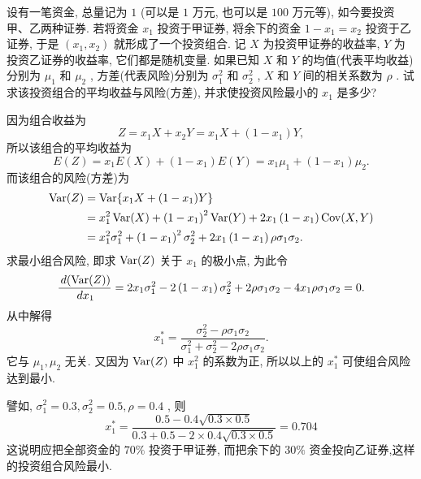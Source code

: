 	\begin{example}[(投资风险组合)]\label{exam:3.4.11}
		设有一笔资金, 总量记为 $1$ (可以是 $1$ 万元, 也可以是 $100$ 万元等), 如今要投资甲、乙两种证券. 若将资金 $x_1$ 投资于甲证券, 将余下的资金 $1-x_1=x_2$ 投资于乙证券, 于是 $(x_1,x_2)$ 就形成了一个投资组合. 记 $X$ 为投资甲证券的收益率, $Y$ 为投资乙证券的收益率, 它们都是随机变量. 如果已知 $X$ 和 $Y$ 的均值(代表平均收益)分别为 $\mu_1$ 和 $\mu_2$ , 方差(代表风险)分别为 $\sigma_1^2$ 和 $\sigma_2^2$ , $X$ 和 $Y$ 间的相关系数为 $\rho$ . 试求该投资组合的平均收益与风险(方差), 并求使投资风险最小的 $x_1$ 是多少?
		\begin{solution}
			因为组合收益为
			\begin{equation*}
				Z=x_{1} X+x_{2} Y=x_{1} X+\left(1-x_{1}\right) Y,
			\end{equation*}
			所以该组合的平均收益为
			\begin{equation*}
				E(Z)=x_{1} E(X)+\left(1-x_{1}\right) E(Y)=x_{1} \mu_{1}+\left(1-x_{1}\right) \mu_{2}.
			\end{equation*}
			而该组合的风险(方差)为
			\begin{align*}
				\operatorname{Var}(Z)&=\operatorname{Var}\{ x_1 X+(1-x_1)Y \}\\
				&=x_{1}^{2} \operatorname{Var}(X)+\left(1-x_{1}\right)^{2} \operatorname{Var}(Y)+2 x_{1}\left(1-x_{1}\right) \operatorname{Cov}(X, Y)\\
				&=x_{1}^{2} \sigma_{1}^{2}+\left(1-x_{1}\right)^{2} \sigma_{2}^{2}+2 x_{1}\left(1-x_{1}\right) \rho \sigma_{1} \sigma_{2}.
			\end{align*}
			求最小组合风险, 即求 $\operatorname{Var}(Z)$ 关于 $x_1$ 的极小点, 为此令
			\begin{equation*}
				\frac{\,d(\operatorname{Var}(Z))}{\,d x_{1}}=2 x_{1} \sigma_{1}^{2}-2\left(1-x_{1}\right) \sigma_{2}^{2}+2 \rho \sigma_{1} \sigma_{2}-4 x_{1} \rho \sigma_{1} \sigma_{2}=0.
			\end{equation*}
			从中解得
			\begin{equation*}
				x_1^{*}=\frac{\sigma_{2}^{2}-\rho \sigma_{1} \sigma_{2}}{\sigma_{1}^{2}+\sigma_{2}^{2}-2 \rho \sigma_{1} \sigma_{2}}.
			\end{equation*}
			它与 $\mu_1,\mu_2$ 无关. 又因为 $\operatorname{Var}(Z)$ 中 $x_1^2$ 的系数为正, 所以以上的 $x_1^{*}$ 可使组合风险达到最小.
		\end{solution}
		譬如, $\sigma_{1}^{2}=0.3, \sigma_{2}^{2}=0.5, \rho=0.4$ , 则
		\begin{equation*}
			x_{1}^{*}=\frac{0.5-0.4 \sqrt{0.3 \times 0.5}}{0.3+0.5-2 \times 0.4 \sqrt{0.3 \times 0.5}}=0.704
		\end{equation*}
		这说明应把全部资金的 $70\%$ 投资于甲证券, 而把余下的 $30\%$ 资金投向乙证券,这样的投资组合风险最小.
	\end{example}
